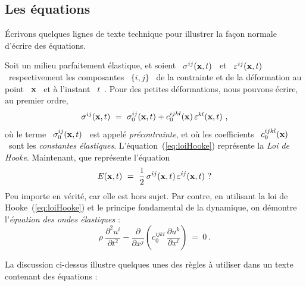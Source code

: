 \documentclass{ipgpmaster}
\begin{document}
\subsection{Les équations}

Écrivons quelques lignes de texte technique pour illustrer la façon 
normale d'écrire des équations.

Soit un milieu parfaitement élastique, et soient
\ $ \sigma^{ij} ({\bf x},t) $ \ 
et
\ $ \varepsilon^{ij} ({\bf x},t) $ \ 
respectivement les composantes 
\ $ \{i,j\} $ \ 
de la contrainte et de la déformation au point 
\ $ {\bf x} $ \ 
et à l'instant 
\ $ t $~.
Pour des petites déformations, nous pouvons écrire, au premier ordre,
\begin{equation}
     \sigma^{ij} ({\bf x},t) 
     \ = \  
     \sigma_0^{ij} ({\bf x},t) 
     + 
     c_0^{ijkl} ({\bf x}) 
     \,  
     \varepsilon^{kl} ({\bf x},t) 
     \ , 
          \label{eq:loiHooke}
\end{equation}
où le terme 
\ $ \sigma_0^{ij} ({\bf x},t) $ \ 
est appelé \emph{précontrainte\/}, et où les coefficients 
\ $ c_0^{ijkl} ({\bf x}) $ \ 
sont les \emph{constantes élastiques\/}. 
L'équation~(\ref{eq:loiHooke}) représente la \emph{ Loi de Hooke\/}.
Maintenant, que représente l'équation
\begin{equation}
     E({\bf x},t) 
     \ = \  
     \frac{1}{2} 
     \, 
     \sigma^{ij} ({\bf x},t) 
     \, 
     \varepsilon^{ij} ({\bf x},t)
     \ ? 
          \label{eq:energydensity}
\end{equation}
Peu importe en vérité, car elle est hors sujet. 
Par contre, en utilisant la loi de Hooke~(\ref{eq:loiHooke}) et le principe
 fondamental de la dynamique, 
on démontre l'\emph{équation des ondes élastiques\/} :
\begin{equation}
     \rho \ 
     \frac{\partial^2 u^i}{\partial t^2} 
     - 
     \frac{\partial}{\partial x^j} 
     \left( 
           c_0^{ijkl} 
           \, 
           \frac{\partial u^k}{\partial x^l} 
     \right)
     \ = \  
     0 
     \ . 
          \label{eq:ondes}
\end{equation}

La discussion ci-dessus illustre quelques unes des règles à utiliser dans 
un texte contenant des équations :
\end{document}
